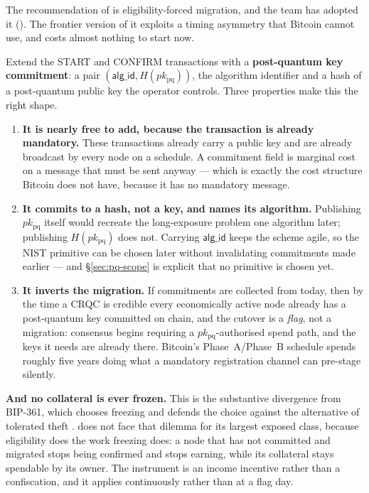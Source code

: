 \begin{remark}
\label{rem:pq-prestage}
The recommendation of  is eligibility-forced migration, and the team has
adopted it  (\planned). The frontier version of it exploits
a timing asymmetry that Bitcoin cannot use, and costs almost nothing to start now.

Extend the \FluxNode{} START and CONFIRM transactions with a \textbf{post-quantum key commitment}: a
pair $(\mathsf{alg\_id}, H(pk_{\mathrm{pq}}))$, the algorithm identifier and a hash of a
post-quantum public key the operator controls. Three properties make this the right shape.
\begin{enumerate}
  \item \textbf{It is nearly free to add, because the transaction is already mandatory.} These
  transactions already carry a public key and are already broadcast by every node on a schedule. A
  commitment field is marginal cost on a message that must be sent anyway --- which is exactly the
  cost structure Bitcoin does not have, because it has no mandatory message.
  \item \textbf{It commits to a hash, not a key, and names its algorithm.} Publishing
  $pk_{\mathrm{pq}}$ itself would recreate the long-exposure problem one algorithm later; publishing
  $H(pk_{\mathrm{pq}})$ does not. Carrying $\mathsf{alg\_id}$ keeps the scheme agile, so the NIST
  primitive can be chosen later without invalidating commitments made earlier --- and
  \S\ref{sec:pq-scope} is explicit that no primitive is chosen yet.
  \item \textbf{It inverts the migration.} If commitments are collected from today, then by the time
  a CRQC is credible every economically active node already has a post-quantum key committed on
  chain, and the cutover is a \emph{flag}, not a migration: consensus begins requiring a
  $pk_{\mathrm{pq}}$-authorised spend path, and the keys it needs are already there. Bitcoin's
  Phase~A/Phase~B schedule spends roughly five years doing what a mandatory registration channel can
  pre-stage silently.
\end{enumerate}

\textbf{And no collateral is ever frozen.} This is the substantive divergence from BIP-361, which
chooses freezing and defends the choice against the alternative of tolerated theft
\citep{bip361}. \Flux{} does not face that dilemma for its largest exposed class, because eligibility
does the work freezing does: a node that has not committed and migrated stops being confirmed and
stops earning, while its collateral stays spendable by its owner. The instrument is an income
incentive rather than a confiscation, and it applies continuously rather than at a flag day.


\end{remark}
